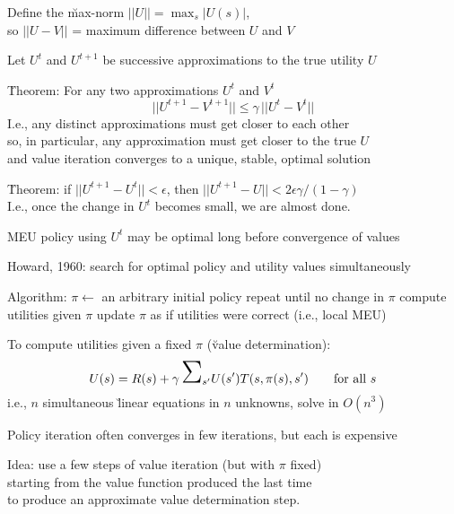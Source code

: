 \documentclass{article}
\begin{document}
\begin{huge}
\textwidth
{}


Define the \u{max-norm} $||U|| = \max_s |U(s)|$,\\
so $||U-V||$ = maximum difference between $U$ and $V$

Let $U^t$ and $U^{t+1}$ be successive approximations to the true utility $U$

\u{Theorem}: For any two approximations $U^t$ and $V^t$
\[ ||U^{t+1}-V^{t+1}|| \leq \gamma\, ||U^{t}-V^{t}|| \]
I.e., any distinct approximations must get closer to each other\\
so, in particular, any approximation must get closer to the true $U$\\
and value iteration converges to a unique, stable, optimal solution

\u{Theorem}: if $||U^{t+1} - U^t||<\epsilon$, then $||U^{t+1} - U||<2\epsilon\gamma/(1-\gamma)$\\
I.e., once the change in $U^t$ becomes small, we are almost done.

MEU policy using $U^t$ may be optimal long before convergence of values


Howard, 1960: search for optimal policy and utility values simultaneously

Algorithm:\al
  $\pi \leftarrow {}$ an arbitrary initial policy\al
  repeat until no change in $\pi$\nl
    compute utilities given $\pi$\nl
    update $\pi$ as if utilities were correct (i.e., local MEU)

To compute utilities given a fixed $\pi$ (\u{value determination}):
\[ U(s) = R(s) + \gamma\,\mysum_{s'} U(s') T(s,\pi(s),s')\qquad \mbox{for all } s \]
i.e., $n$ simultaneous \u{linear} equations in $n$ unknowns,
solve in $O(n^3)$


Policy iteration often converges in few iterations, but each is expensive

Idea: use a few steps of value iteration (but with $\pi$ fixed)\\
starting from the value function produced the last time\\
to produce an approximate value determination step.


\end{huge}
\end{document}
